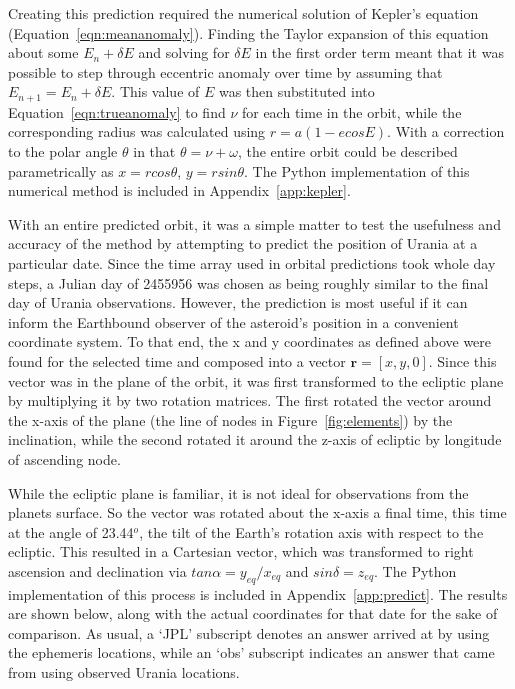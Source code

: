 \documentclass[a4paper,12pt]{article}
\begin{document}
Creating this prediction required the numerical solution of Kepler's equation (Equation~\ref{eqn:meananomaly}). Finding the Taylor expansion of this equation about some $E_n+\delta E$ and solving for $\delta E$ in the first order term meant that it was possible to step through eccentric anomaly over time by assuming that $E_{n+1} = E_n + \delta E$. This value of $E$ was then substituted into Equation~\ref{eqn:trueanomaly} to find $\nu$ for each time in the orbit, while the corresponding radius was calculated using $r = a(1-ecosE)$. With a correction to the polar angle $\theta$ in that $\theta = \nu + \omega$, the entire orbit could be described parametrically as $x = rcos\theta$, $y = rsin\theta$. The Python implementation of this numerical method is included in Appendix~\ref{app:kepler}.

With an entire predicted orbit, it was a simple matter to test the usefulness and accuracy of the method by attempting to predict the position of Urania at a particular date. Since the time array used in orbital predictions took whole day steps, a Julian day of 2455956 was chosen as being roughly similar to the final day of Urania observations. However, the prediction is most useful if it can inform the Earthbound observer of the asteroid's position in a convenient coordinate system. To that end, the x and y coordinates as defined above were found for the selected time and composed into a vector $\mathbf{r} = [x,y,0]$. Since this vector was in the plane of the orbit, it was first transformed to the ecliptic plane by multiplying it by two rotation matrices. The first rotated the vector around the x-axis of the plane (the line of nodes in Figure~\ref{fig:elements}) by the inclination, while the second rotated it around the z-axis of ecliptic by longitude of ascending node.

While the ecliptic plane is familiar, it is not ideal for observations from the planets surface. So the vector was rotated about the x-axis a final time, this time at the angle of 23.44$^o$, the tilt of the Earth's rotation axis with respect to the ecliptic. This resulted in a Cartesian vector, which was transformed to right ascension and declination via $tan\alpha = y_{eq}/x_{eq}$ and $sin\delta = z_{eq}$. The Python implementation of this process is included in Appendix~\ref{app:predict}. The results are shown below, along with the actual coordinates for that date for the sake of comparison. As usual, a `JPL' subscript denotes an answer arrived at by using the ephemeris locations, while an `obs' subscript indicates an answer that came from using observed Urania locations.
\end{document}
